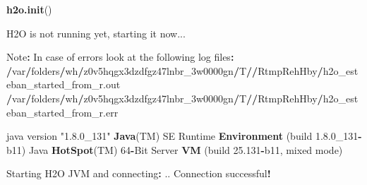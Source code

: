\documentclass[
]{book}
\newenvironment{Shaded}{\begin{snugshade}}{\end{snugshade}}
\newcommand{\DecValTok}[1]{\textcolor[rgb]{0.00,0.00,0.81}{#1}}
\newcommand{\ErrorTok}[1]{\textcolor[rgb]{0.64,0.00,0.00}{\textbf{#1}}}
\newcommand{\FloatTok}[1]{\textcolor[rgb]{0.00,0.00,0.81}{#1}}
\newcommand{\KeywordTok}[1]{\textcolor[rgb]{0.13,0.29,0.53}{\textbf{#1}}}
\newcommand{\NormalTok}[1]{#1}
\newcommand{\OperatorTok}[1]{\textcolor[rgb]{0.81,0.36,0.00}{\textbf{#1}}}
\newcommand{\StringTok}[1]{\textcolor[rgb]{0.31,0.60,0.02}{#1}}
\begin{document}
\begin{Shaded}
\begin{Highlighting}[]
\KeywordTok{h2o.init}\NormalTok{()}

\NormalTok{H2O is not running yet, starting it now...}

\NormalTok{Note}\OperatorTok{:}\StringTok{  }\NormalTok{In case of errors look at the following log files}\OperatorTok{:}
\StringTok{    }\ErrorTok{/}\NormalTok{var}\OperatorTok{/}\NormalTok{folders}\OperatorTok{/}\NormalTok{wh}\OperatorTok{/}\NormalTok{z0v5hqgx3dzdfgz47lnbr_3w0000gn}\OperatorTok{/}\NormalTok{T}\OperatorTok{/}\ErrorTok{/}\NormalTok{RtmpRehHby}\OperatorTok{/}\NormalTok{h2o_esteban_started_from_r.out}
    \OperatorTok{/}\NormalTok{var}\OperatorTok{/}\NormalTok{folders}\OperatorTok{/}\NormalTok{wh}\OperatorTok{/}\NormalTok{z0v5hqgx3dzdfgz47lnbr_3w0000gn}\OperatorTok{/}\NormalTok{T}\OperatorTok{/}\ErrorTok{/}\NormalTok{RtmpRehHby}\OperatorTok{/}\NormalTok{h2o_esteban_started_from_r.err}

\NormalTok{java version }\StringTok{"1.8.0_131"}
\KeywordTok{Java}\NormalTok{(TM) SE Runtime }\KeywordTok{Environment}\NormalTok{ (build }\DecValTok{1}\NormalTok{.}\FloatTok{8.0}\NormalTok{_}\DecValTok{131}\OperatorTok{-}\NormalTok{b11)}
\NormalTok{Java }\KeywordTok{HotSpot}\NormalTok{(TM) }\DecValTok{64}\OperatorTok{-}\NormalTok{Bit Server }\KeywordTok{VM}\NormalTok{ (build }\FloatTok{25.131}\OperatorTok{-}\NormalTok{b11, mixed mode)}

\NormalTok{Starting H2O JVM and connecting}\OperatorTok{:}\StringTok{ }\NormalTok{.. Connection successful}\OperatorTok{!}


\end{Highlighting}
\end{Shaded}
\end{document}
